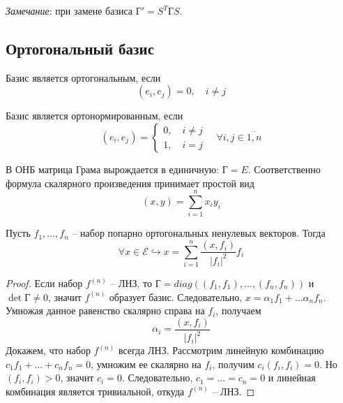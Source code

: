 \textit{Замечание}: при замене базиса $\textbf{Г}'=S^T\textbf{Г}S$.
\subsection{Ортогональный базис}
\begin{definition}
    Базис является ортогональным, если 
    \[
    (e_i, e_j)=0, \quad i \neq j
    \]
\end{definition}
\begin{definition}
    Базис является ортонормированным, если 
    \[
    (e_i, e_j)=\left\{
    \begin{aligned}
    0, \quad i\neq j\\
    1, \quad i = j
    \end{aligned}
    \right. \quad \forall i, j \in \overline{1,n}
    \]
\end{definition}

В ОНБ матрица Грама вырождается в единичную: $\textbf{Г}=E$. Соответственно формула скалярного произведения принимает простой вид
\[
(x,y)
 = \sum_{i=1}^nx_iy_i
\]
\begin{proposition}
    Пусть $f_1, \dots, f_n$ -- набор попарно ортогональных ненулевых векторов. Тогда
    \[
    \forall x\in \mathcal{E} \hookrightarrow x=\sum_{i=1}^n \frac{(x,f_i)}{|f_i|^2}f_i
    \]
\end{proposition}
\begin{proof}
    Если набор $f^{(n)}$ -- ЛНЗ, то $\textbf{Г}=diag((f_1, f_1), \dots, (f_n, f_n))$ и $\det \textbf{Г} \neq 0$, значит $f^{(n)}$ образует базис. Следовательно, $x=\alpha_1f_1+\dots\alpha_nf_n$. Умножая данное равенство скалярно справа на $f_i$, получаем 
    \[
    \alpha_i=\frac{(x,f_i)}{|f_i|^2}
    \]
    Докажем, что набор $f^{(n)}$ всегда ЛНЗ. Рассмотрим линейную комбинацию $c_1f_1+\dots + c_n f_n=0$, умножим ее скалярно на $f_i$, получим $c_i(f_i, f_i)=0$. Но $(f_i, f_i) > 0$, значит $c_i=0$. Следовательно, $c_1=\dots=c_n=0$ и линейная комбинация является тривиальной, откуда $f^{(n)}$ -- ЛНЗ. 
\end{proof}